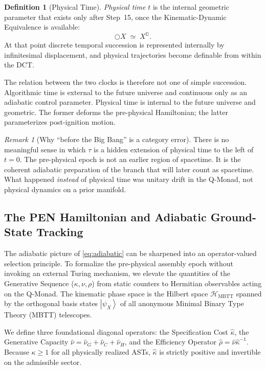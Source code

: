 \documentclass[11pt,a4paper]{article}
\theoremstyle{plain}
\theoremstyle{definition}
\newtheorem{definition}[theorem]{Definition}
\theoremstyle{remark}
\newtheorem{remark}[theorem]{Remark}
\newcommand{\D}{\mathbb{D}}
\newcommand{\nextmod}{\bigcirc}
\newcommand{\HMBTT}{\mathcal{H}_{\mathrm{MBTT}}}
\providecommand{\ket}[1]{\left|#1\right\rangle}
\begin{document}
\begin{definition}[Physical Time]
\label{def:phys-time}
\emph{Physical time} $t$ is the internal geometric parameter that exists only after Step~15, once the Kinematic-Dynamic Equivalence is available:
\begin{equation}
    \nextmod X \;\simeq\; X^{\D}.
\end{equation}
At that point discrete temporal succession is represented internally by infinitesimal displacement, and physical trajectories become definable from within the DCT.
\end{definition}

The relation between the two clocks is therefore not one of simple succession.
Algorithmic time is external to the future universe and continuous only as an adiabatic control parameter.
Physical time is internal to the future universe and geometric.
The former deforms the pre-physical Hamiltonian; the latter parameterizes post-ignition motion.

\begin{remark}[Why ``before the Big Bang'' is a category error]
\label{rem:category-error}
There is no meaningful sense in which $\tau$ is a hidden extension of physical time to the left of $t = 0$.
The pre-physical epoch is not an earlier region of spacetime.
It is the coherent adiabatic preparation of the branch that will later count as spacetime.
What happened \emph{instead} of physical time was unitary drift in the Q-Monad, not physical dynamics on a prior manifold.
\end{remark}

\subsection{The PEN Hamiltonian and Adiabatic Ground-State Tracking}
\label{sec:pen_hamiltonian}

The adiabatic picture of \eqref{eq:adiabatic} can be sharpened into an operator-valued selection principle.
To formalize the pre-physical assembly epoch without invoking an external Turing mechanism, we elevate the quantities of the Generative Sequence ($\kappa, \nu, \rho$) from static counters to Hermitian observables acting on the Q-Monad.
The kinematic phase space is the Hilbert space $\HMBTT$ spanned by the orthogonal basis states $\ket{\psi_X}$ of all anonymous Minimal Binary Type Theory (MBTT) telescopes.

We define three foundational diagonal operators: the Specification Cost $\hat{\kappa}$, the Generative Capacity $\hat{\nu} = \hat{\nu}_G + \hat{\nu}_C + \hat{\nu}_H$, and the Efficiency Operator $\hat{\rho} = \hat{\nu}\hat{\kappa}^{-1}$.
Because $\kappa \ge 1$ for all physically realized ASTs, $\hat{\kappa}$ is strictly positive and invertible on the admissible sector.
\end{document}
